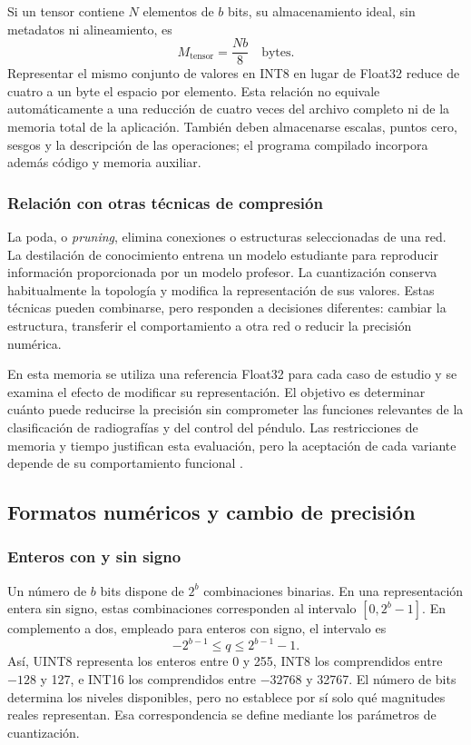 Si un tensor contiene $N$ elementos de $b$ bits, su almacenamiento ideal, sin metadatos ni alineamiento, es
\begin{equation}
M_{\mathrm{tensor}}=\frac{Nb}{8}\quad\text{bytes}.
\end{equation}
Representar el mismo conjunto de valores en INT8 en lugar de Float32 reduce de cuatro a un byte el espacio por elemento. Esta relación no equivale automáticamente a una reducción de cuatro veces del archivo completo ni de la memoria total de la aplicación. También deben almacenarse escalas, puntos cero, sesgos y la descripción de las operaciones; el programa compilado incorpora además código y memoria auxiliar.

\subsubsection{Relación con otras técnicas de compresión}
La poda, o \textit{pruning}, elimina conexiones o estructuras seleccionadas de una red. La destilación de conocimiento entrena un modelo estudiante para reproducir información proporcionada por un modelo profesor. La cuantización conserva habitualmente la topología y modifica la representación de sus valores. Estas técnicas pueden combinarse, pero responden a decisiones diferentes: cambiar la estructura, transferir el comportamiento a otra red o reducir la precisión numérica.

En esta memoria se utiliza una referencia Float32 para cada caso de estudio y se examina el efecto de modificar su representación. El objetivo es determinar cuánto puede reducirse la precisión sin comprometer las funciones relevantes de la clasificación de radiografías y del control del péndulo. Las restricciones de memoria y tiempo justifican esta evaluación, pero la aceptación de cada variante depende de su comportamiento funcional \cite{nagel2021}.

\subsection{Formatos numéricos y cambio de precisión}
\subsubsection{Enteros con y sin signo}
Un número de $b$ bits dispone de $2^b$ combinaciones binarias. En una representación entera sin signo, estas combinaciones corresponden al intervalo $[0,2^b-1]$. En complemento a dos, empleado para enteros con signo, el intervalo es
\begin{equation}
-2^{b-1}\leq q\leq 2^{b-1}-1.
\end{equation}
Así, UINT8 representa los enteros entre 0 y 255, INT8 los comprendidos entre $-128$ y 127, e INT16 los comprendidos entre $-32768$ y 32767. El número de bits determina los niveles disponibles, pero no establece por sí solo qué magnitudes reales representan. Esa correspondencia se define mediante los parámetros de cuantización.

